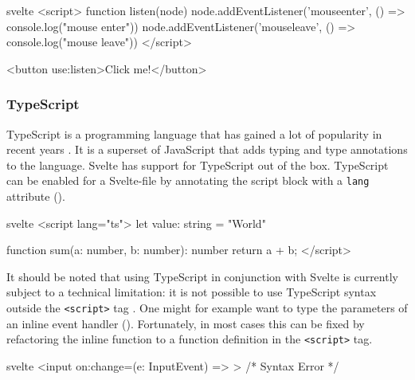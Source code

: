 \begin{listing}[H]
\begin{myminted}{svelte}{}
<script>
  function listen(node) {
    node.addEventListener('mouseenter', () => console.log("mouse enter"))
    node.addEventListener('mouseleave', () => console.log("mouse leave"))
  }
</script>

<button use:listen>Click me!</button>
\end{myminted}
\caption{Example usage of actions to register an event listener.}
\label{fig:svelte-use-directive}
\end{listing}


\subsubsection{TypeScript}
TypeScript is a programming language that has gained a lot of popularity in recent years \cite{noauthor_stack_nodate}. It is a superset of JavaScript that adds typing and type annotations to the language. Svelte has support for TypeScript out of the box. TypeScript can be enabled for a Svelte-file by annotating the script block with a \texttt{lang} attribute (). 
\begin{listing}[H]
\begin{myminted}{svelte}{}
<script lang="ts">
  let value: string = "World"

  function sum(a: number, b: number): number {
    return a + b;
  }
</script>
\end{myminted}
\caption{Svelte-file that uses TypeScript.}
\label{fig:svelte-ts-usage}
\end{listing}

It should be noted that using TypeScript in conjunction with Svelte is currently subject to a technical limitation: it is not possible to use TypeScript syntax outside the \texttt{<script>} tag \cite{noauthor_proposal_nodate}. One might for example want to type the parameters of an inline event handler (). Fortunately, in most cases this can be fixed by refactoring the inline function to a function definition in the \texttt{<script>} tag.
\begin{listing}[H]
\begin{myminted}{svelte}{}
<input on:change={(e: InputEvent) => {}}> /* Syntax Error */
\end{myminted}
\caption{TypeScript-syntax in inline functions is currently possible.}
\label{fig:svelte-ts-inline-error}
\end{listing}

